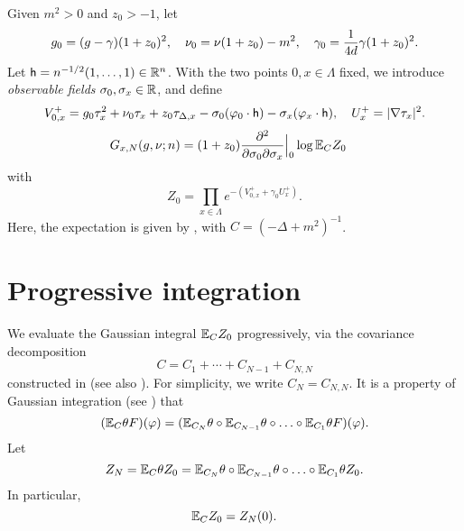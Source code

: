 Given $m^2>0$ and $z_0 >-1$, let
\begin{equation}
\label{e:gg0}
g_0 = (g - \gamma) (1 + z_0)^2,
	\quad
\nu_0 = \nu (1 + z_0) - m^2,
	\quad
\gamma_0 = \frac{1}{4d} \gamma (1 + z_0)^2.
\end{equation}
Let ${\sf h} = n^{-1/2}(1, \ldots, 1) \in {\mathbb R}^n$.
With the two points $0,x\in \Lambda$ fixed,
we introduce \emph{observable fields} $\sigma_0, \sigma_x \in {\mathbb R}$, and define
\begin{equation}
\label{e:V0def}
	V^+_{0,x}
	= g_0\tau_x^2 + \nu_0 \tau_x + z_0 \tau_{\Delta,x} -
	\sigma_0 (\varphi_{0} \cdot {\sf h})
	- \sigma_x (\varphi_{x} \cdot {\sf h}),
	\quad
	U^+_x = |\nabla \tau_x|^2.
\end{equation}
\begin{align}
\label{e:generating-fn}
G_{x,N}(g, \nu; n)
	&=
(1+z_0)
\frac{\partial^2 }{\partial \sigma_0  \partial \sigma_x}\Big|_{0}
\log \mathbb{E}_C  Z_0
\end{align}
with
\begin{equation}
\label{e:Z0def}
Z_0 = \prod_{x\in \Lambda} e^{-(V^+_{0,x} + \gamma_0 U^+_x)}.
\end{equation}
Here, the expectation is given by , with $C = (-\Delta + m^2)^{-1}$.


\section{Progressive integration}
\label{sec:prog}

We evaluate the Gaussian integral $\mathbb{E}_C Z_0$ progressively, via
the covariance decomposition
\begin{equation}
\label{e:NCj}
C = C_1 + \cdots + C_{N-1} + C_{N,N}
\end{equation}
constructed in \cite{Baue13a} (see also \cite{BGM04}). For simplicity, we write $C_N = C_{N,N}$.
It is a property of Gaussian integration (see \cite{BS-rg-norm}) that
\begin{equation}
	(\mathbb{E}_C \theta F)(\varphi)
	=
	(\mathbb{E}_{C_N}\theta \circ \mathbb{E}_{C_{N-1}}\theta \circ \ldots \circ \mathbb{E}_{C_1}\theta F)
	(\varphi).
\end{equation}
Let
\begin{equation}
\label{e:ZNdef}
Z_N = \mathbb{E}_C \theta Z_0
=
\mathbb{E}_{C_N}\theta \circ \mathbb{E}_{C_{N-1}}\theta \circ \ldots \circ \mathbb{E}_{C_1}\theta Z_0.
\end{equation}
In particular,
\begin{equation}
\mathbb{E}_C Z_0 = Z_N(0).
\end{equation}

